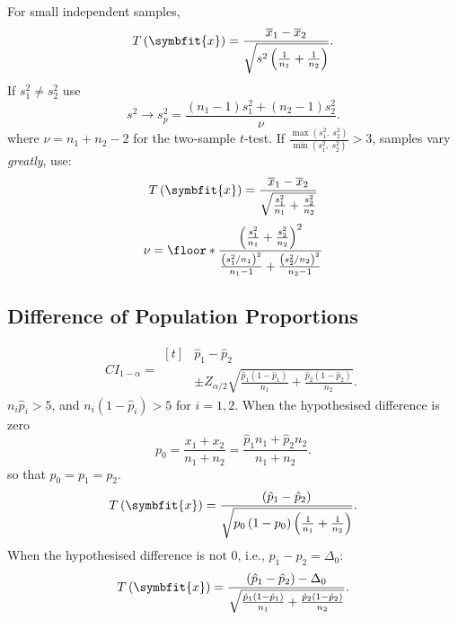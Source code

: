 \documentclass{article}
\begin{document}
\begin{multicols}{3}
    For small independent samples,
    \begin{equation*}
        T\left( \symbfit{x} \right) = \frac{\overline{x}_1 - \overline{x}_2}{\sqrt{s^2\left( \frac{1}{n_1} + \frac{1}{n_2} \right)}}.
    \end{equation*}
    If \(s_1^2 \ne s_2^2\) use
    \begin{equation*}
        s^2 \rightarrow s_p^2 = \frac{\left( n_1 - 1 \right)s_1^2 + \left( n_2 - 1 \right)s_2^2}{\nu}.
    \end{equation*}
    where \(\nu = n_1 + n_2 - 2\) for the two-sample \(t\)-test.
    If \(
    \frac{\max{\left( s_1^2,\: s_2^2 \right)}}{\min{\left( s_1^2,\: s_2^2 \right)}} > 3
    \), samples vary \textit{greatly}, use:
    \begin{equation*}
        T\left( \symbfit{x} \right) = \frac{\overline{x}_1 - \overline{x}_2 }{\sqrt{\frac{s_1^2}{n_1} + \frac{s_2^2}{n_2}}}
    \end{equation*}
    \begin{equation*}
        \nu = \floor*{\frac{\left( \frac{s_1^2}{n_1} + \frac{s_2^2}{n_2} \right)^2}{\frac{\left( s_1^2 / n_1 \right)^2}{n_1 - 1} + \frac{\left( s_2^2 / n_2 \right)^2}{n_2 - 1}}}
    \end{equation*}
    \subsection{Difference of Population Proportions}
    \begin{equation*}
        {CI}_{1-\alpha} = \begin{aligned}[t]
             & \hat{p}_1 - \hat{p}_2                                                                                                            \\
             & \pm Z_{\alpha/2} \sqrt{\tfrac{\hat{p}_1\left( 1 - \hat{p}_1 \right)}{n_1} + \tfrac{\hat{p}_2\left( 1 - \hat{p}_2 \right)}{n_2}}.
        \end{aligned}
    \end{equation*}
    \(n_i \hat{p}_i > 5\), and
    \(n_i \left( 1 - \hat{p}_i \right) > 5\) for \(i=1,2\).
    When the hypothesised difference is zero
    \begin{equation*}
        p_0 = \frac{x_1 + x_2}{n_1 + n_2} = \frac{\hat{p}_1 n_1 + \hat{p}_2 n_2}{n_1 + n_2}.
    \end{equation*}
    so that \(p_0 = p_1 = p_2\).
    \begin{equation*}
        T\left( \symbfit{x} \right) = \frac{\left( \hat{p}_1 - \hat{p}_2 \right)}{\sqrt{p_0 \left( 1 - p_0 \right) \left( \frac{1}{n_1} + \frac{1}{n_2} \right)}}.
    \end{equation*}
    When the hypothesised difference is not 0, i.e., \(p_1 - p_2 = \Delta_0\):
    \begin{equation*}
        T\left( \symbfit{x} \right) = \frac{\left( \hat{p}_1 - \hat{p}_2 \right) - \Delta_0}{\sqrt{\frac{\hat{p}_1 \left( 1 - \hat{p}_1 \right)}{n_1} + \frac{\hat{p}_2 \left( 1 - \hat{p}_2 \right)}{n_2}}}.
    \end{equation*}

\end{multicols}
\end{document}
